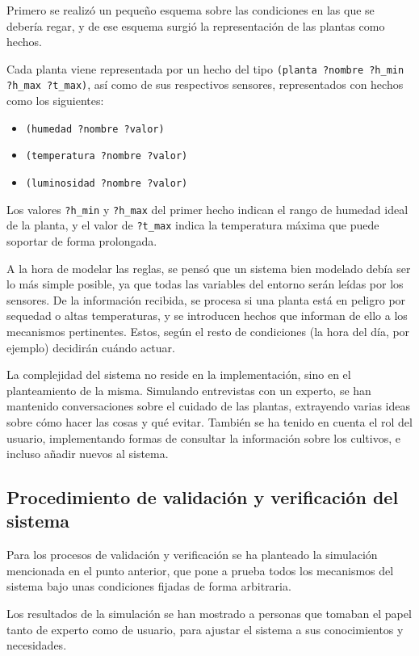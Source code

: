 \documentclass[11pt,a4paper]{article}
\begin{document}
Primero se realizó un pequeño esquema sobre las condiciones en las que se debería regar, y de ese esquema surgió la representación de las plantas como hechos. 

Cada planta viene representada por un hecho del tipo \texttt{(planta ?nombre ?h\_min ?h\_max ?t\_max)}, así como de sus respectivos sensores, representados con hechos como los siguientes:

\begin{itemize}
\item \texttt{(humedad ?nombre ?valor)}
\item \texttt{(temperatura ?nombre ?valor)}
\item \texttt{(luminosidad ?nombre ?valor)}
\end{itemize}

Los valores \texttt{?h\_min} y \texttt{?h\_max} del primer hecho indican el rango de humedad ideal de la planta, y el valor de \texttt{?t\_max} indica la temperatura máxima que puede soportar de forma prolongada.

\medskip

A la hora de modelar las reglas, se pensó que un sistema bien modelado debía ser lo más simple posible, ya que todas las variables del entorno serán leídas por los sensores. De la información recibida, se procesa si una planta está en peligro por sequedad o altas temperaturas, y se introducen hechos que informan de ello a los mecanismos pertinentes. Estos, según el resto de condiciones (la hora del día, por ejemplo) decidirán cuándo actuar. 

La complejidad del sistema no reside en la implementación, sino en el planteamiento de la misma. Simulando entrevistas con un experto, se han mantenido conversaciones sobre el cuidado de las plantas, extrayendo varias ideas sobre cómo hacer las cosas y qué evitar. También se ha tenido en cuenta el rol del usuario, implementando formas de consultar la información sobre los cultivos, e incluso añadir nuevos al sistema.

\subsection{Procedimiento de validación y verificación del sistema}
Para los procesos de validación y verificación se ha planteado la simulación mencionada en el punto anterior, que pone a prueba todos los mecanismos del sistema bajo unas condiciones fijadas de forma arbitraria.

Los resultados de la simulación se han mostrado a personas que tomaban el papel tanto de experto como de usuario, para ajustar el sistema a sus conocimientos y necesidades.
\end{document}
